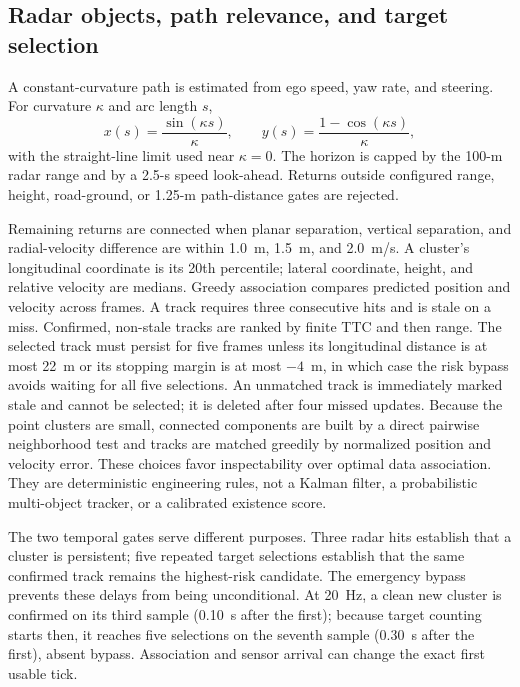 \documentclass[conference]{IEEEtran}
\begin{document}
\subsection{Radar objects, path relevance, and target selection}
A constant-curvature path is estimated from ego speed, yaw rate, and steering.
For curvature $\kappa$ and arc length $s$,
\begin{equation}
 x(s)=\frac{\sin(\kappa s)}{\kappa},\qquad
 y(s)=\frac{1-\cos(\kappa s)}{\kappa},
 \label{eq:path}
\end{equation}
with the straight-line limit used near $\kappa=0$. The horizon is capped by the
100-m radar range and by a 2.5-s speed look-ahead. Returns outside configured
range, height, road-ground, or 1.25-m path-distance gates are rejected.

Remaining returns are connected when planar separation, vertical separation,
and radial-velocity difference are within 1.0~m, 1.5~m, and 2.0~m/s. A cluster's
longitudinal coordinate is its 20th percentile; lateral coordinate, height, and
relative velocity are medians. Greedy association compares predicted position
and velocity across frames. A track requires three consecutive hits and is stale
on a miss. Confirmed, non-stale tracks are ranked by finite TTC and then range.
The selected track must persist for five frames unless its longitudinal distance
is at most 22~m or its stopping margin is at most $-4$~m, in which case the risk
bypass avoids waiting for all five selections. An unmatched track is immediately
marked stale and cannot be selected; it is deleted after four missed updates.
Because the point clusters are small, connected components are built by a direct
pairwise neighborhood test and tracks are matched greedily by normalized
position and velocity error. These choices favor inspectability over optimal
data association. They are deterministic engineering rules, not a Kalman filter,
a probabilistic multi-object tracker, or a calibrated existence score.

The two temporal gates serve different purposes. Three radar hits establish
that a cluster is persistent; five repeated target selections establish that the
same confirmed track remains the highest-risk candidate. The emergency bypass
prevents these delays from being unconditional. At 20~Hz, a clean new cluster is
confirmed on its third sample (0.10~s after the first); because target counting
starts then, it reaches five selections on the seventh sample (0.30~s after the
first), absent bypass. Association and sensor arrival can change the exact first
usable tick.
\end{document}
